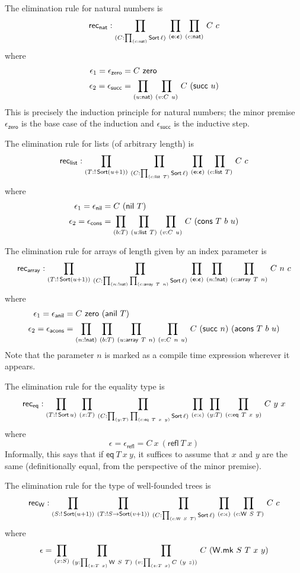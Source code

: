 \begin{eg}
	The elimination rule for natural numbers is
	\[ \rec{\mathsf{nat}} : \prd{C:\prd{c:\mathsf{nat}} \Sort \ell}{\vb e : \bm \epsilon}{c : \mathsf{nat}} C\ c \]
	where
	\begin{align*}
		\epsilon_1 = \epsilon_{\mathsf{zero}} &= C\ \mathsf{zero} \\
		\epsilon_2 = \epsilon_{\mathsf{succ}} &= \prd{u:\mathsf{nat}}{v:C\ u} C\ (\mathsf{succ}\ u)
	\end{align*}
	This is precisely the induction principle for natural numbers; the minor premise \( \epsilon_{\mathsf{zero}} \) is the base case of the induction and \( \epsilon_{\mathsf{succ}} \) is the inductive step.
\end{eg}
\begin{eg}[lists]
	The elimination rule for lists (of arbitrary length) is
	\[ \rec{\mathsf{list}} : \prd{T:!\Sort (u+1)}{C:\prd{c:\mathsf{list}\ T} \Sort \ell}{\vb e : \bm \epsilon}{c:\mathsf{list}\ T} C\ c \]
	where
	\begin{align*}
		\epsilon_1 = \epsilon_{\mathsf{nil}} &= C\ (\mathsf{nil}\ T) \\
		\epsilon_2 = \epsilon_{\mathsf{cons}} &= \prd{b:T}{u:\mathsf{list}\ T}{v:C\ u} C\ (\mathsf{cons}\ T\ b\ u)
	\end{align*}
\end{eg}
\begin{eg}[arrays]
	The elimination rule for arrays of length given by an index parameter is
	\[ \rec{\mathsf{array}} : \prd{T:!\Sort (u+1)}{C:\prd{n:!\mathsf{nat}}{c:\mathsf{array}\ T\ n}\Sort \ell}{\vb e : \bm \epsilon}{n:!\mathsf{nat}}{c:\mathsf{array}\ T\ n}C\ n\ c \]
	where
	\begin{align*}
		\epsilon_1 = \epsilon_{\mathsf{anil}} &= C\ \mathsf{zero}\ (\mathsf{anil}\ T) \\
		\epsilon_2 = \epsilon_{\mathsf{acons}} &= \prd{n:!\mathsf{nat}}{b:T}{u:\mathsf{array}\ T\ n}{v:C\ n\ u} C\ (\mathsf{succ}\ n)\ (\mathsf{acons}\ T\ b\ u)
	\end{align*}
	Note that the parameter \( n \) is marked as a compile time expression wherever it appears.
\end{eg}
\begin{eg}[equality]
	The elimination rule for the equality type is
	\[ \rec{\mathsf{eq}} : \prd{T:!\Sort u}{x:T}{C:\prd{y:T}{c:\mathsf{eq}\ T\ x\ y}\Sort \ell}{e : \epsilon}{y:T}{c:\mathsf{eq}\ T\ x\ y}C\ y\ x \]
	where
	\[ \epsilon = \epsilon_{\mathsf{refl}} = C\ x\ (\mathsf{refl}\ T\ x) \]
	Informally, this says that if \( \mathsf{eq}\ T\ x\ y \), it suffices to assume that \( x \) and \( y \) are the same (definitionally equal, from the perspective of the minor premise).
\end{eg}
\begin{eg}
	The elimination rule for the type of well-founded trees is
	\[ \rec{\mathsf{W}} : \prd{S:!\Sort(u+1)}{T:!S\to\Sort(v+1)}{C:\prd{c:\mathsf{W}\ S\ T}\Sort \ell}{e:\epsilon}{c:\mathsf{W}\ S\ T}C\ c \]
	where
	\[ \epsilon = \prd{x:S}{y:\prd{z:T\ x}\mathsf{W}\ S\ T}{v:\prd{z:T\ x}C\ (y\ z)}C\ (\mathsf{W.mk}\ S\ T\ x\ y) \]
\end{eg}


